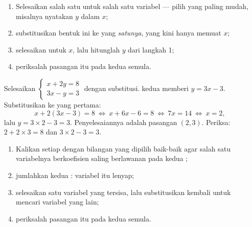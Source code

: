 \begin{method}[Substitusi]\label{met:g10:lines:substitution}
\begin{enumerate}
  \item Selesaikan salah satu  untuk salah satu variabel --- pilih
        yang paling mudah, misalnya nyatakan $y$ dalam $x$;
  \item substitusikan bentuk ini ke  yang \emph{satunya}, yang kini
        hanya memuat $x$;
  \item selesaikan untuk $x$, lalu hitunglah $y$ dari langkah 1;
  \item periksalah pasangan itu pada kedua  semula.
\end{enumerate}
\end{method}

\begin{example}\label{ex:g10:lines:substitution}
Selesaikan $\begin{cases} x + 2y = 8 \\ 3x - y = 3 \end{cases}$ dengan
substitusi.  kedua memberi $y = 3x - 3$. Substitusikan ke yang
pertama:
\[
x + 2(3x - 3) = 8
\ \Longleftrightarrow\
x + 6x - 6 = 8
\ \Longleftrightarrow\
7x = 14
\ \Longleftrightarrow\
x = 2 ,
\]
lalu $y = 3 \times 2 - 3 = 3$. Penyelesaiannya adalah pasangan $(2, 3)$.
Periksa: $2 + 2 \times 3 = 8$ dan $3 \times 2 - 3 = 3$.
\end{example}

\begin{method}[Eliminasi]\label{met:g10:lines:elimination}
\begin{enumerate}
  \item Kalikan setiap  dengan bilangan yang dipilih baik-baik agar
        salah satu variabelnya berkoefisien saling berlawanan pada kedua ;
  \item jumlahkan kedua : variabel itu lenyap;
  \item selesaikan \omterm{def:g10:algebra:equation}{persamaan} satu variabel yang tersisa, lalu substitusikan
        kembali untuk mencari variabel yang lain;
  \item periksalah pasangan itu pada kedua \omterm{def:g10:algebra:equation}{persamaan} semula.
\end{enumerate}
\end{method}

